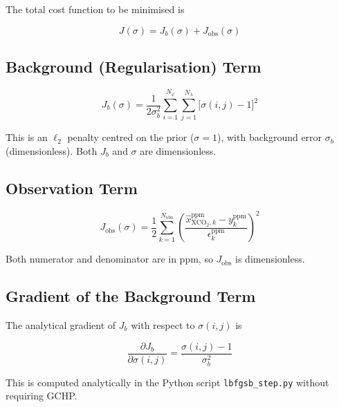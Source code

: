 \documentclass[12pt]{article}
\begin{document}
The total cost function to be minimised is

\begin{equation}
  \boxed{J(\sigma) = J_b(\sigma) + J_{\mathrm{obs}}(\sigma)}
  \label{eq:J_total}
\end{equation}

\subsection{Background (Regularisation) Term}

\begin{equation}
  J_b(\sigma) = \frac{1}{2\sigma_b^2}
    \sum_{i=1}^{N_\varphi} \sum_{j=1}^{N_\lambda}
    \bigl[\sigma(i,j) - 1\bigr]^2
  \label{eq:J_b}
\end{equation}

This is an $\ell_2$ penalty centred on the prior ($\sigma = 1$), with background
error $\sigma_b$ (dimensionless). Both $J_b$ and $\sigma$ are dimensionless.

\subsection{Observation Term}

\begin{equation}
  J_{\mathrm{obs}}(\sigma) = \frac{1}{2}
    \sum_{k=1}^{N_{\mathrm{obs}}}
    \left(\frac{\hat{x}_{\mathrm{XCO}_2,k}^{\mathrm{ppm}} - y_k^{\mathrm{ppm}}}
               {\epsilon_k^{\mathrm{ppm}}}\right)^2
  \label{eq:J_obs}
\end{equation}

Both numerator and denominator are in ppm, so $J_{\mathrm{obs}}$ is dimensionless.

\subsection{Gradient of the Background Term}

The analytical gradient of $J_b$ with respect to $\sigma(i,j)$ is

\begin{equation}
  \frac{\partial J_b}{\partial \sigma(i,j)}
  = \frac{\sigma(i,j) - 1}{\sigma_b^2}
  \label{eq:grad_Jb}
\end{equation}

This is computed analytically in the Python script \texttt{lbfgsb\_step.py}
without requiring GCHP.

\end{document}
